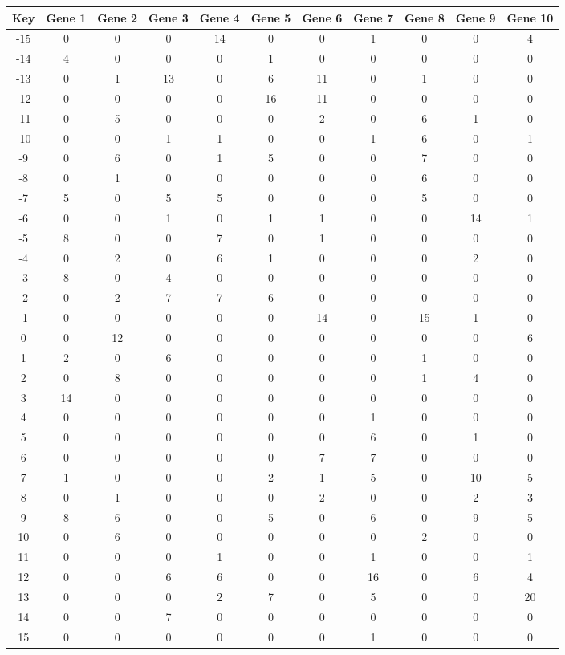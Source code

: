 \begin{tabular}{|c|c|c|c|c|c|c|c|c|c|c|}
\hline
Key & Gene 1 & Gene 2 & Gene 3 & Gene 4 & Gene 5 & Gene 6 & Gene 7 & Gene 8 & Gene 9 & Gene 10 \\
\hline
-15 & 0 & 0 & 0 & 14 & 0 & 0 & 1 & 0 & 0 & 4 \\
-14 & 4 & 0 & 0 & 0 & 1 & 0 & 0 & 0 & 0 & 0 \\
-13 & 0 & 1 & 13 & 0 & 6 & 11 & 0 & 1 & 0 & 0 \\
-12 & 0 & 0 & 0 & 0 & 16 & 11 & 0 & 0 & 0 & 0 \\
-11 & 0 & 5 & 0 & 0 & 0 & 2 & 0 & 6 & 1 & 0 \\
-10 & 0 & 0 & 1 & 1 & 0 & 0 & 1 & 6 & 0 & 1 \\
-9 & 0 & 6 & 0 & 1 & 5 & 0 & 0 & 7 & 0 & 0 \\
-8 & 0 & 1 & 0 & 0 & 0 & 0 & 0 & 6 & 0 & 0 \\
-7 & 5 & 0 & 5 & 5 & 0 & 0 & 0 & 5 & 0 & 0 \\
-6 & 0 & 0 & 1 & 0 & 1 & 1 & 0 & 0 & 14 & 1 \\
-5 & 8 & 0 & 0 & 7 & 0 & 1 & 0 & 0 & 0 & 0 \\
-4 & 0 & 2 & 0 & 6 & 1 & 0 & 0 & 0 & 2 & 0 \\
-3 & 8 & 0 & 4 & 0 & 0 & 0 & 0 & 0 & 0 & 0 \\
-2 & 0 & 2 & 7 & 7 & 6 & 0 & 0 & 0 & 0 & 0 \\
-1 & 0 & 0 & 0 & 0 & 0 & 14 & 0 & 15 & 1 & 0 \\
0 & 0 & 12 & 0 & 0 & 0 & 0 & 0 & 0 & 0 & 6 \\
1 & 2 & 0 & 6 & 0 & 0 & 0 & 0 & 1 & 0 & 0 \\
2 & 0 & 8 & 0 & 0 & 0 & 0 & 0 & 1 & 4 & 0 \\
3 & 14 & 0 & 0 & 0 & 0 & 0 & 0 & 0 & 0 & 0 \\
4 & 0 & 0 & 0 & 0 & 0 & 0 & 1 & 0 & 0 & 0 \\
5 & 0 & 0 & 0 & 0 & 0 & 0 & 6 & 0 & 1 & 0 \\
6 & 0 & 0 & 0 & 0 & 0 & 7 & 7 & 0 & 0 & 0 \\
7 & 1 & 0 & 0 & 0 & 2 & 1 & 5 & 0 & 10 & 5 \\
8 & 0 & 1 & 0 & 0 & 0 & 2 & 0 & 0 & 2 & 3 \\
9 & 8 & 6 & 0 & 0 & 5 & 0 & 6 & 0 & 9 & 5 \\
10 & 0 & 6 & 0 & 0 & 0 & 0 & 0 & 2 & 0 & 0 \\
11 & 0 & 0 & 0 & 1 & 0 & 0 & 1 & 0 & 0 & 1 \\
12 & 0 & 0 & 6 & 6 & 0 & 0 & 16 & 0 & 6 & 4 \\
13 & 0 & 0 & 0 & 2 & 7 & 0 & 5 & 0 & 0 & 20 \\
14 & 0 & 0 & 7 & 0 & 0 & 0 & 0 & 0 & 0 & 0 \\
15 & 0 & 0 & 0 & 0 & 0 & 0 & 1 & 0 & 0 & 0 \\
\hline
\end{tabular}